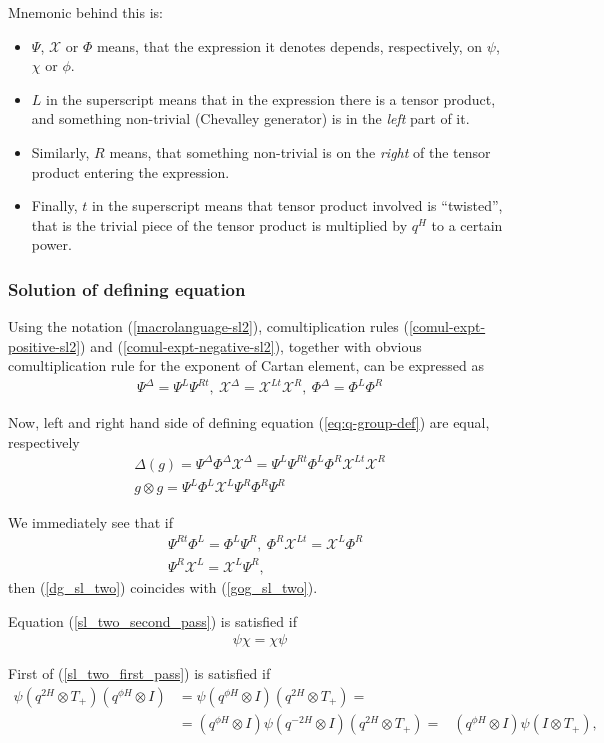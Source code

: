 \documentclass{article}
\newcommand{\lb}{\left (}
\newcommand{\rb}{\right )}
\newcommand{\be}{\begin{eqnarray}}
\newcommand{\ee}{\end{eqnarray}}
\newcommand {\?}{\textit{???}}
\def\dg{\Delta (g)}
\def\gog{g \otimes g}
\def\Chi{\mathcal{X}}
\newcommand{\EChiL}[1][]{\Chi^L_{#1}}
\newcommand{\EChiR}[1][]{\Chi^R_{#1}}
\newcommand{\EChiLT}[1][]{\Chi^{Lt}_{#1}}
\newcommand{\EChiD}[1][]{\Chi^\Delta_{#1}}
\newcommand{\EPsiL}[1][]{\Psi^L_{#1}}
\newcommand{\EPsiR}[1][]{\Psi^R_{#1}}
\newcommand{\EPsiRT}[1][]{\Psi^{Rt}_{#1}}
\newcommand{\EPsiD}[1][]{\Psi^\Delta_{#1}}
\newcommand{\QPhiL}[1][]{\Phi^L_{#1}}
\newcommand{\QPhiR}[1][]{\Phi^R_{#1}}
\newcommand{\QPhiD}[1][]{\Phi^\Delta_{#1}}
\newcommand{\delabel}[1]{(\ref{#1})}
\begin{document}
Mnemonic behind this is:
\begin{itemize}
\item $\Psi$, $\Chi$ or $\Phi$ means, that the expression it denotes depends, respectively,
on $\psi$, $\chi$ or $\phi$.
\item $L$ in the superscript means that in the expression there is a tensor product,
and something non-trivial (Chevalley generator) is in the {\it left} part of it.
\item Similarly, $R$ means, that something non-trivial is on the {\it right} of the tensor product entering the expression.
\item Finally, $t$ in the superscript means that tensor product involved is ``twisted'', that is the trivial piece
of the tensor product is multiplied by $q^H$ to a certain power.
\end{itemize}

\subsubsection{Solution of defining equation}

Using the notation \delabel{macrolanguage-sl2}, comultiplication rules \delabel{comul-expt-positive-sl2} and
\delabel{comul-expt-negative-sl2}, together with obvious comultiplication rule for the exponent of Cartan element,
can be expressed as
\be
\EPsiD = \EPsiL \EPsiRT,\ \EChiD = \EChiLT \EChiR,\ \QPhiD = \QPhiL \QPhiR
\ee

Now, left and right hand side of defining equation \delabel{eq:q-group-def} are equal, respectively
\be
& \dg = \EPsiD \QPhiD \EChiD = \EPsiL \EPsiRT \QPhiL \QPhiR \EChiLT \EChiR \label{dg_sl_two} & \\
& \gog = \EPsiL \QPhiL \EChiL \EPsiR \QPhiR \EPsiR \label{gog_sl_two} &
\ee

We immediately see that if
\be
& \EPsiRT \QPhiL = \QPhiL \EPsiR,\ \QPhiR \EChiLT = \EChiL \QPhiR \label{sl_two_first_pass} \\
& \EPsiR \EChiL = \EChiL \EPsiR \label{sl_two_second_pass}
,
\ee
then (\ref{dg_sl_two}) coincides with (\ref{gog_sl_two}).

Equation (\ref{sl_two_second_pass}) is satisfied if
\be
\psi \chi = \chi \psi
\ee

First of (\ref{sl_two_first_pass}) is satisfied if
\be
\psi \lb q^{2H} \otimes T_+ \rb \lb q^{\phi H} \otimes I \rb & = \psi \lb q^{\phi H} \otimes I \rb \lb q^{2H} \otimes T_+ \rb = & \nonumber \\
& = \lb q^{\phi H} \otimes I \rb \psi \lb q^{-2H} \otimes I \rb \lb q^{2H} \otimes T_+ \rb = & \lb q^{\phi H} \otimes I \rb \psi \lb I \otimes T_+ \rb,
\ee
\end{document}
